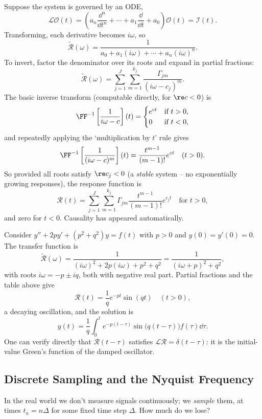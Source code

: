 Suppose the system is governed by an ODE,
$$
\mathcal{L} \mathcal{O}(t) = \left(a_n \frac{\dd^n}{\dd t^n} + \cdots + a_1 \frac{\dd}{\dd t} + a_0\right)\mathcal{O}(t) = \mathcal{I}(t).
$$
Transforming, each derivative becomes $i \omega$, so
$$
\tilde{\mathcal{R}}(\omega) = \frac{1}{a_0 + a_1 (i\omega) + \cdots + a_n (i \omega)^n}.
$$
To invert, factor the denominator over its roots and expand in partial fractions:
$$
\tilde{\mathcal{R}}(\omega) = \sum_{j = 1}^{J} \sum_{m = 1}^{k_j} \frac{\Gamma_{jm}}{(i \omega - c_j)^m}.
$$
The basic inverse transform (computable directly, for $\re c < 0$) is
$$
\FF^{-1}\left[\frac{1}{i\omega - c}\right](t) = \begin{cases}
    e^{ct} &\mbox{if } t > 0, \\
    0 &\mbox{if } t < 0,
\end{cases}
$$
and repeatedly applying the `multiplication by $t$' rule gives
$$
\FF^{-1}\left[\frac{1}{(i \omega - c)^m}\right](t) = \frac{t^{m - 1}}{(m-1)!} e^{ct} \quad (t > 0).
$$
So provided all roots satisfy $\re c_j < 0$ (a \emph{stable} system -- no exponentially growing responses), the response function is
$$
\mathcal{R}(t) = \sum_{j = 1}^{J}\sum_{m = 1}^{k_j} \Gamma_{jm} \frac{t^{m - 1}}{(m - 1)!} e^{c_j t} \quad \text{for } t > 0,
$$
and zero for $t < 0$. Causality has appeared automatically.

\begin{example}
    Consider $y'' + 2p y' + (p^2 + q^2) y = f(t)$ with $p > 0$ and $y(0) = y'(0) = 0$. The transfer function is
    $$
    \tilde{\mathcal{R}}(\omega) = \frac{1}{(i\omega)^2 + 2p (i \omega) + p^2 + q^2} = \frac{1}{(i \omega + p)^2 + q^2},
    $$
    with roots $i \omega = -p \pm iq$, both with negative real part. Partial fractions and the table above give
    $$
    \mathcal{R}(t) = \frac{1}{q} e^{-pt} \sin (qt) \quad (t > 0),
    $$
    a decaying oscillation, and the solution is
    $$
    y(t) = \frac{1}{q}\int_0^t e^{-p(t - \tau)} \sin\big(q(t - \tau)\big) f(\tau) \dd \tau.
    $$
    One can verify directly that $\mathcal{R}(t - \tau)$ satisfies $\mathcal{L}\mathcal{R} = \delta(t - \tau)$: it is the initial-value Green's function of the damped oscillator.
\end{example}

\subsection{Discrete Sampling and the Nyquist Frequency}

In the real world we don't measure signals continuously; we \emph{sample} them, at times $t_n = n \Delta$ for some fixed time step $\Delta$. How much do we lose?


